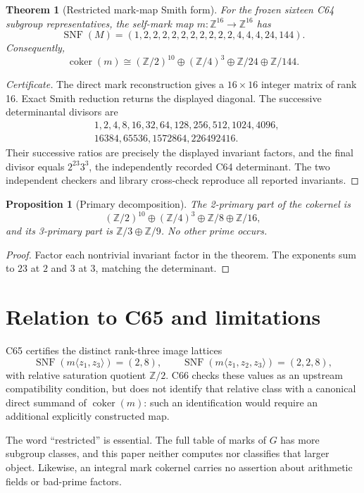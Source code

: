 \documentclass[10pt]{article}
\newtheorem{theorem}{Theorem}
\newtheorem{proposition}{Proposition}
\newcommand{\Z}{\mathbb Z}
\begin{document}
\begin{theorem}[Restricted mark-map Smith form]
For the frozen sixteen C64 subgroup representatives, the self-mark map
$m:\Z^{16}\to\Z^{16}$ has
\[
\operatorname{SNF}(M)=
 (1,2,2,2,2,2,2,2,2,2,2,4,4,4,24,144).
\]
Consequently,
\[
\operatorname{coker}(m)\cong
 (\Z/2)^{10}\oplus(\Z/4)^3\oplus\Z/24\oplus\Z/144.
\]
\end{theorem}

\begin{proof}[Certificate]
The direct mark reconstruction gives a $16\times16$ integer matrix of rank
16.  Exact Smith reduction returns the displayed diagonal.  The successive
determinantal divisors are
\[
\begin{split}
&1,2,4,8,16,32,64,128,256,512,1024,4096,\\
&16384,65536,1572864,226492416.
\end{split}
\]
Their successive ratios are precisely the displayed invariant factors, and
the final divisor equals $2^{23}3^3$, the independently recorded C64
determinant.  The two independent checkers and library cross-check reproduce
all reported invariants.
\end{proof}

\begin{proposition}[Primary decomposition]
The 2-primary part of the cokernel is
\[
(\Z/2)^{10}\oplus(\Z/4)^3\oplus\Z/8\oplus\Z/16,
\]
and its 3-primary part is $\Z/3\oplus\Z/9$.  No other prime occurs.
\end{proposition}

\begin{proof}
Factor each nontrivial invariant factor in the theorem.  The exponents sum to
$23$ at $2$ and $3$ at $3$, matching the determinant.
\end{proof}

\section{Relation to C65 and limitations}
C65 certifies the distinct rank-three image lattices
\[
\operatorname{SNF}(m\langle z_1,z_3\rangle)=(2,8),\qquad
\operatorname{SNF}(m\langle z_1,z_2,z_3\rangle)=(2,2,8),
\]
with relative saturation quotient $\mathbb Z/2$.  C66 checks these values as
an upstream compatibility condition, but does not identify that relative
class with a canonical direct summand of $\operatorname{coker}(m)$: such an
identification would require an additional explicitly constructed map.

The word ``restricted'' is essential.  The full table of marks of $G$ has
more subgroup classes, and this paper neither computes nor classifies that
larger object.  Likewise, an integral mark cokernel carries no assertion
about arithmetic fields or bad-prime factors.
\end{document}

